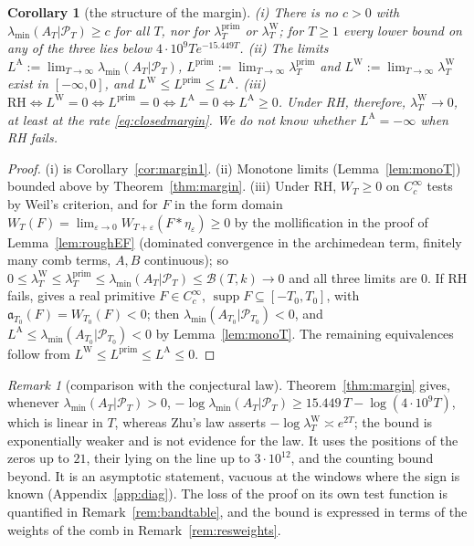 \documentclass[11pt]{amsart}
\newtheorem{corollary}[theorem]{Corollary}
\theoremstyle{definition}
\theoremstyle{remark}
\newtheorem{remark}[theorem]{Remark}
\newcommand{\supp}{\operatorname{supp}}
\newcommand{\PT}{\mathcal P_T}
\newcommand{\lamP}{\lambda^{\mathrm{prim}}_T}
\newcommand{\lamW}{\lambda^{\mathrm W}_T}
\newcommand{\lamA}{\lambda_{\min}(A_T|\PT)}
\begin{document}
\begin{corollary}[the structure of the margin]\label{cor:margin2}
\emph{(i)} There is no $c>0$ with $\lamA\ge c$ for all $T$, nor for $\lamP$ or $\lamW$; for $T\ge1$ every
lower bound on any of the three lies below $4\cdot10^9Te^{-15.449T}$.
\emph{(ii)} The limits $L^{\mathrm A}:=\lim_{T\to\infty}\lamA$, $L^{\mathrm{prim}}:=\lim_{T\to\infty}\lamP$ and
$L^{\mathrm W}:=\lim_{T\to\infty}\lamW$ exist in $[-\infty,0]$, and $L^{\mathrm W}\le L^{\mathrm{prim}}\le L^{\mathrm A}$.
\emph{(iii)} $\mathrm{RH}\iff L^{\mathrm W}=0\iff L^{\mathrm{prim}}=0\iff L^{\mathrm A}=0\iff L^{\mathrm A}\ge0$.
Under RH, therefore, $\lamW\to0$, at least at the rate \eqref{eq:closedmargin}. We do not know whether $L^{\mathrm A}=-\infty$
when RH fails.
\end{corollary}
\begin{proof}
(i) is Corollary~\ref{cor:margin1}. (ii) Monotone limits (Lemma~\ref{lem:monoT}) bounded above by
Theorem~\ref{thm:margin}. (iii) Under RH, $W_T\ge0$ on $C_c^\infty$ tests by Weil's criterion, and for
$F$ in the form domain $W_T(F)=\lim_{\varepsilon\to0}W_{T+\varepsilon}(F*\eta_\varepsilon)\ge0$ by the
mollification in the proof of Lemma~\ref{lem:roughEF} (dominated convergence in the archimedean term,
finitely many comb terms, $A,B$ continuous); so $0\le\lamW\le\lamP\le\lamA\le\mathcal B(T,k)\to0$ and all
three limits are $0$. If RH fails, \cite[Thm.~11.3]{Paper45} gives a real primitive $F\in C_c^\infty$,
$\supp F\subseteq[-T_0,T_0]$, with $\mathfrak a_{T_0}(F)=W_{T_0}(F)<0$; then $\lambda_{\min}(A_{T_0}|\mathcal P_{T_0})<0$,
and $L^{\mathrm A}\le\lambda_{\min}(A_{T_0}|\mathcal P_{T_0})<0$ by Lemma~\ref{lem:monoT}. The remaining
equivalences follow from $L^{\mathrm W}\le L^{\mathrm{prim}}\le L^{\mathrm A}\le0$.
\end{proof}


\begin{remark}[comparison with the conjectural law]\label{rem:margin}
Theorem~\ref{thm:margin} gives, whenever $\lamA>0$, $-\log\lamA\ge15.449\,T-\log(4\cdot10^9T)$, which is linear in
$T$, whereas Zhu's law asserts $-\log\lamW\asymp e^{2T}$; the bound is exponentially weaker and is not evidence
for the law. It uses the positions of the zeros up to $21$, their lying on the line up to $3\cdot10^{12}$, and
the counting bound beyond. It is an asymptotic statement, vacuous at the windows where the sign is known
(Appendix~\ref{app:diag}). The loss of the proof on its own test function is quantified in
Remark~\ref{rem:bandtable}, and the bound is expressed in terms of the weights of the comb in
Remark~\ref{rem:resweights}.
\end{remark}
\end{document}
